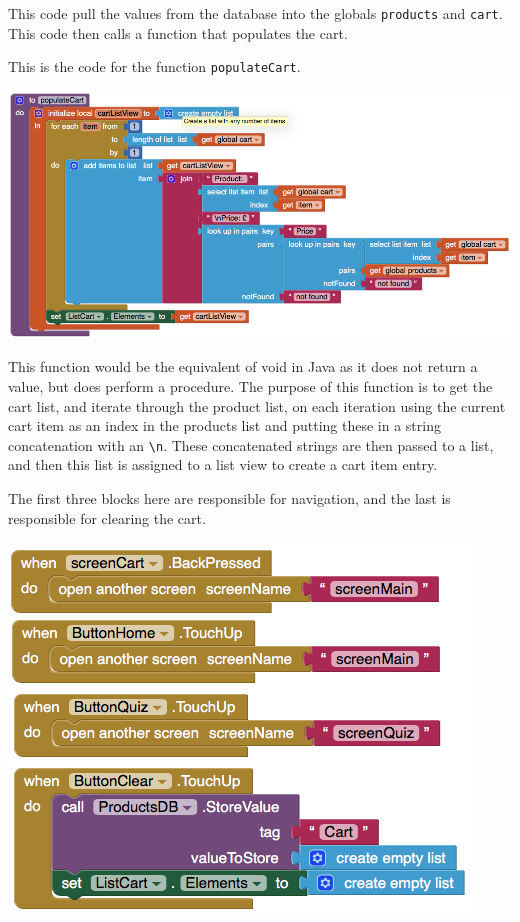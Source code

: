 \documentclass{scrreprt}
\begin{document}
This code pull the values from the database into the globals \texttt{products} and \texttt{cart}. This code then calls a function that populates the cart.

This is the code for the function \texttt{populateCart}.

\begin{center}
    \includegraphics[width=\linewidth]{images/cartPopulate.png}
\end{center}

This function would be the equivalent of void in Java as it does not return a value, but does perform a procedure. The purpose of this function is to get the cart list, and iterate through the product list, on each iteration using the current cart item as an index in the products list and putting these in a string concatenation with an \texttt{\textbackslash n}. These concatenated strings are then passed to a list, and then this list is assigned to a list view to create a cart item entry.

The first three blocks here are responsible for navigation, and the last is responsible for clearing the cart.

\begin{center}
    \includegraphics[width=0.75\linewidth]{images/cartNavigation.png}
\end{center}
\end{document}
